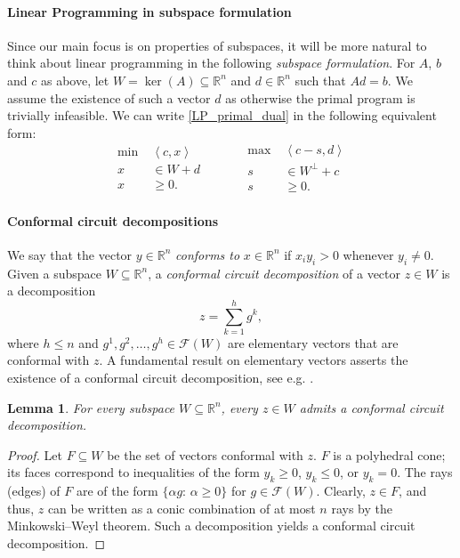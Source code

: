 \documentclass[11pt, a4paper]{article}
\newcommand{\pr}[2]{\left\langle #1, #2 \right\rangle}
\newcommand{\1}{\mathbbm{1}}
\newcommand{\EE}{\mathcal F}
\newtheorem{lemma}[theorem]{Lemma}
\theoremstyle{case}
\newcommand{\R}{\mathbb{R}}
\begin{document}
\paragraph{Linear Programming  in subspace formulation}
Since our main focus is on properties of subspaces, it will be more natural to think about linear programming in the following \emph{subspace formulation}.
For $A$, $b$ and $c$ as above,  let $W=\ker(A)\subseteq \R^n$ and $d\in \R^n$ such that $Ad=b$. We assume the existence of such a vector $d$ as otherwise the primal program is trivially infeasible. We can write \ref{LP_primal_dual}  in the following equivalent form:
\begin{equation}
\tag{LP$(W,d,c)$}
\label{LP-subspace-f}
\begin{aligned}
\min \; & \pr{c}{x} \\ 
x &\in W + d \\
x &\geq 0.\,
\end{aligned}
\quad\quad\quad
\begin{aligned}
\max \; & \pr{c - s}{d} \\
s &\in W^\perp + c \\
s & \geq 0.
\end{aligned}
\end{equation}

\paragraph{Conformal circuit decompositions}
\label{par:sign_consistent}
We say that the vector $y \in \R^n$ \emph{conforms to}
$x\in\R^n$ if $x_iy_i > 0$ whenever $y_i\neq 0$. 
Given a subspace $W\subseteq \R^n$, a \emph{conformal circuit decomposition} of a vector $z\in W$ is a decomposition
\[
z=\sum_{k=1}^h  g^k,
\]
where
$h\le n$ and  $g^1,g^2,\ldots,g^h\in \EE(W)$ are elementary vectors that are conformal with
$z$. A fundamental result on elementary vectors asserts the existence of a conformal circuit decomposition, see e.g. \cite{Fulkerson1968,RockafellarTheEV}.

\begin{lemma} \label{lem:sign-cons}
For every subspace $W\subseteq \R^n$,  every $z\in W$ admits a conformal circuit decomposition. 
\end{lemma}
\begin{proof}
Let $F \subseteq W$ be the set of vectors conformal with $z$. $F$ is a polyhedral cone; its
 faces  correspond to inequalities of the form $y_k \geq 0$, $y_k\leq 0$,
or $y_k = 0$.
The rays (edges) of $F$ are of the form $\{\alpha g:\,  \alpha\ge 0\}$  for $g\in\EE(W)$. Clearly, $z\in F$, and thus, $z$ can be written as a conic combination of at most $n$ rays by the Minkowski--Weyl theorem. Such a decomposition yields a conformal circuit decomposition.
\end{proof}
\end{document}
